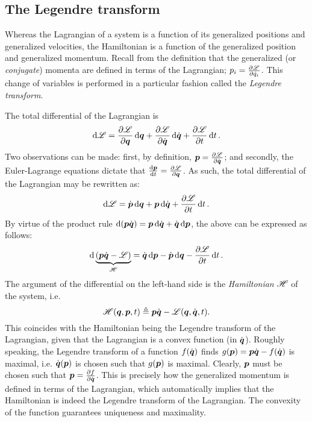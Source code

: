 \subsection{The Legendre transform}
Whereas the Lagrangian of a system is a function of its generalized positions and generalized velocities, the Hamiltonian is a function of the generalized position and generalized momentum. Recall from the definition that the generalized (or \emph{conjugate}) momenta are defined in terms of the Lagrangian; $p_i = \pdv{\ensuremath{\mathscr{L}}}{\dot{q}_i}$. This change of variables is performed in a particular fashion called the \emph{Legendre transform}.

The total differential of the Lagrangian is
$$ \dd{\ensuremath{\mathscr{L}}} = \pdv{\ensuremath{\mathscr{L}}}{\ensuremath{\vb*{q}}}\dd{\ensuremath{\vb*{q}}} + \pdv{\ensuremath{\mathscr{L}}}{\ensuremath{\dot{\vb*{q}}}}\dd{\ensuremath{\dot{\vb*{q}}}} + \pdv{\ensuremath{\mathscr{L}}}{t}\dd{t}. $$
Two observations can be made: first, by definition, $\vb*{p} = \pdv{\ensuremath{\mathscr{L}}}{\ensuremath{\dot{\vb*{q}}}}$; and secondly, the Euler-Lagrange equations dictate that $\dv{\ensuremath{\vb*{p}}}{t} = \pdv{\ensuremath{\mathscr{L}}}{\ensuremath{\vb*{q}}}$. As such, the total differential of the Lagrangian may be rewritten as: \cite{Landau1960}
$$ \dd{\ensuremath{\mathscr{L}}} = \dot{\vb*{p}}\dd{\ensuremath{\vb*{q}}} + \vb*{p} \dd{\ensuremath{\dot{\vb*{q}}}} + \pdv{\ensuremath{\mathscr{L}}}{t}\dd{t}.$$
By virtue of the product rule $\dd{(\gmom \gvel)} = \gmom\dd{\gvel} + \gvel\dd{\gmom}$, the above can be expressed as follows: 
\begin{equation}
    \dd{\underbrace{(\gmom\gvel - \lag)}_{\ham}} = \gvel\dd{\gmom} - \dot{\gmom}\dd{\gpos} - \pdv{\lag}{t}\dd{t}.
    \label{eq:diff_hamiltonian}
\end{equation}
The argument of the differential on the left-hand side is the \emph{Hamiltonian} $\mathscr{H}$ of the system, i.e. 
$$ \mathscr{H}(\vb*{q}, \vb*{p}, t) \triangleq \vb*{p} \dot{\vb*{q}} - \mathscr{L}(\vb*{q}, \dot{\vb*{q}}, t). $$
This coincides with the Hamiltonian being the Legendre transform of the Lagrangian, given that the Lagrangian is a convex function (in $\dot{\vb*{q}}$). Roughly speaking, the Legendre transform of a function $f(\dot{\vb*{q}})$ finds $g(\vb*{p}) = \vb*{p}\dot{\vb*{q}} - f(\dot{\vb*{q}})$ is maximal, i.e. $\dot{\vb*{q}}(\vb*{p})$ is chosen such that $g(\vb*{p})$ is maximal. Clearly, $\vb*{p}$ must be chosen such that $\vb*{p} = \pdv{f}{\ensuremath{\dot{\vb*{q}}}}$. This is precisely how the generalized momentum is defined in terms of the Lagrangian, which automatically implies that the Hamiltonian is indeed the Legendre transform of the Lagrangian. The convexity of the function guarantees uniqueness and maximality.

